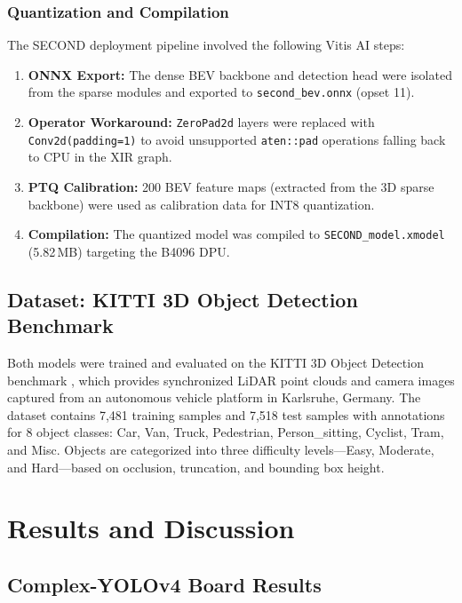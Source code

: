 \documentclass[12pt, a4paper]{report}
\begin{document}
\subsection{Quantization and Compilation}

The SECOND deployment pipeline involved the following Vitis AI steps:

\begin{enumerate}[nosep]
    \item \textbf{ONNX Export:} The dense BEV backbone and detection head were isolated from the sparse modules and exported to \texttt{second\_bev.onnx} (opset 11).
    \item \textbf{Operator Workaround:} \texttt{ZeroPad2d} layers were replaced with \texttt{Conv2d(padding=1)} to avoid unsupported \texttt{aten::pad} operations falling back to CPU in the XIR graph.
    \item \textbf{PTQ Calibration:} 200 BEV feature maps (extracted from the 3D sparse backbone) were used as calibration data for INT8 quantization.
    \item \textbf{Compilation:} The quantized model was compiled to \texttt{SECOND\_model.xmodel} (5.82\,MB) targeting the B4096 DPU.
\end{enumerate}


\section{Dataset: KITTI 3D Object Detection Benchmark}

Both models were trained and evaluated on the KITTI 3D Object Detection benchmark \cite{kitti2012}, which provides synchronized LiDAR point clouds and camera images captured from an autonomous vehicle platform in Karlsruhe, Germany. The dataset contains 7,481 training samples and 7,518 test samples with annotations for 8 object classes: Car, Van, Truck, Pedestrian, Person\_sitting, Cyclist, Tram, and Misc. Objects are categorized into three difficulty levels---Easy, Moderate, and Hard---based on occlusion, truncation, and bounding box height.


\chapter{Results and Discussion}

\section{Complex-YOLOv4 Board Results}
\end{document}
